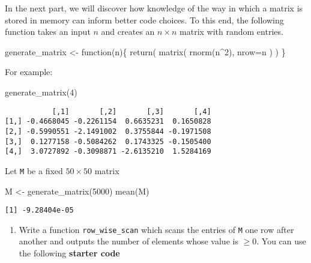 \documentclass[
  letterpaper,
  DIV=11,
  numbers=noendperiod]{scrartcl}
\newenvironment{Shaded}{\begin{snugshade}}{\end{snugshade}}
\newcommand{\AttributeTok}[1]{\textcolor[rgb]{0.40,0.45,0.13}{#1}}
\newcommand{\ControlFlowTok}[1]{\textcolor[rgb]{0.00,0.23,0.31}{#1}}
\newcommand{\DecValTok}[1]{\textcolor[rgb]{0.68,0.00,0.00}{#1}}
\newcommand{\FunctionTok}[1]{\textcolor[rgb]{0.28,0.35,0.67}{#1}}
\newcommand{\NormalTok}[1]{\textcolor[rgb]{0.00,0.23,0.31}{#1}}
\newcommand{\OtherTok}[1]{\textcolor[rgb]{0.00,0.23,0.31}{#1}}
\newcommand{\SpecialCharTok}[1]{\textcolor[rgb]{0.37,0.37,0.37}{#1}}
\providecommand{\tightlist}{%
  \setlength{\itemsep}{0pt}\setlength{\parskip}{0pt}}\usepackage{longtable,booktabs,array}
\begin{document}
In the next part, we will discover how knowledge of the way in which a
matrix is stored in memory can inform better code choices. To this end,
the following function takes an input \(n\) and creates an
\(n \times n\) matrix with random entries.

\begin{Shaded}
\begin{Highlighting}[]
\NormalTok{generate\_matrix }\OtherTok{\textless{}{-}} \ControlFlowTok{function}\NormalTok{(n)\{}
    \FunctionTok{return}\NormalTok{(}
        \FunctionTok{matrix}\NormalTok{(}
            \FunctionTok{rnorm}\NormalTok{(n}\SpecialCharTok{\^{}}\DecValTok{2}\NormalTok{),}
            \AttributeTok{nrow=}\NormalTok{n}
\NormalTok{        )}
\NormalTok{    )}
\NormalTok{\}}
\end{Highlighting}
\end{Shaded}

For example:

\begin{Shaded}
\begin{Highlighting}[]
\FunctionTok{generate\_matrix}\NormalTok{(}\DecValTok{4}\NormalTok{)}
\end{Highlighting}
\end{Shaded}

\begin{verbatim}
           [,1]       [,2]       [,3]       [,4]
[1,] -0.4668045 -0.2261154  0.6635231  0.1650828
[2,] -0.5990551 -2.1491002  0.3755844 -0.1971508
[3,]  0.1277158 -0.5084262  0.1743325 -0.1505400
[4,]  3.0727892 -0.3098871 -2.6135210  1.5284169
\end{verbatim}

Let \texttt{M} be a fixed \(50 \times 50\) matrix

\begin{Shaded}
\begin{Highlighting}[]
\NormalTok{M }\OtherTok{\textless{}{-}} \FunctionTok{generate\_matrix}\NormalTok{(}\DecValTok{5000}\NormalTok{)}
\FunctionTok{mean}\NormalTok{(M)}
\end{Highlighting}
\end{Shaded}

\begin{verbatim}
[1] -9.28404e-05
\end{verbatim}

\begin{enumerate}
\def\labelenumi{\arabic{enumi}.}
\setcounter{enumi}{1}
\tightlist
\item
  Write a function \texttt{row\_wise\_scan} which scans the entries of
  \texttt{M} one row after another and outputs the number of elements
  whose value is \(\ge 0\). You can use the following \textbf{starter
  code}
\end{enumerate}
\end{document}
